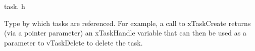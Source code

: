 task. h

Type by which tasks are referenced. For example, a call to x\-Task\-Create returns (via a pointer parameter) an x\-Task\-Handle variable that can then be used as a parameter to v\-Task\-Delete to delete the task. 